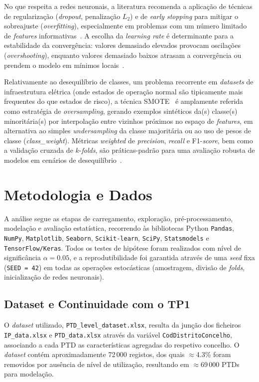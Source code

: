 \documentclass[conference]{IEEEtran}
\begin{document}
No que respeita a redes neuronais, a literatura recomenda a aplicação de técnicas de regularização (\textit{dropout}, penalização $L_2$) e de \textit{early stopping} para mitigar o sobreajuste (\textit{overfitting}), especialmente em problemas com um número limitado de \textit{features} informativas~\cite{b1}. A escolha da \textit{learning rate} é determinante para a estabilidade da convergência: valores demasiado elevados provocam oscilações (\textit{overshooting}), enquanto valores demasiado baixos atrasam a convergência ou prendem o modelo em mínimos locais~\cite{b1}.

Relativamente ao desequilíbrio de classes, um problema recorrente em \textit{datasets} de infraestrutura elétrica (onde estados de operação normal são tipicamente mais frequentes do que estados de risco), a técnica SMOTE~\cite{b1,b3} é amplamente referida como estratégia de \textit{oversampling}, gerando exemplos sintéticos da(s) classe(s) minoritária(s) por interpolação entre vizinhos próximos no espaço de \textit{features}, em alternativa ao simples \textit{undersampling} da classe majoritária ou ao uso de pesos de classe (\textit{class\_weight}). Métricas \textit{weighted} de \textit{precision}, \textit{recall} e F1-\textit{score}, bem como a validação cruzada de $k$-\textit{folds}, são práticas-padrão para uma avaliação robusta de modelos em cenários de desequilíbrio~\cite{b1,b2,b3}.

\section{Metodologia e Dados}

A análise segue as etapas de carregamento, exploração, pré-processamento, modelação e avaliação estatística, recorrendo às bibliotecas Python \texttt{Pandas}, \texttt{NumPy}, \texttt{Matplotlib}, \texttt{Seaborn}, \texttt{Scikit-learn}, \texttt{SciPy}, \texttt{Statsmodels} e \texttt{TensorFlow/Keras}. Todos os testes de hipótese foram realizados com nível de significância $\alpha = 0.05$, e a reprodutibilidade foi garantida através de uma \textit{seed} fixa (\texttt{SEED = 42}) em todas as operações estocásticas (amostragem, divisão de \textit{folds}, inicialização de redes neuronais).

\subsection{Dataset e Continuidade com o TP1}

O \textit{dataset} utilizado, \texttt{PTD\_level\_dataset.xlsx}, resulta da junção dos ficheiros \texttt{IP\_data.xlsx} e \texttt{PTD\_data.xlsx} através da variável \texttt{CodDistritoConcelho}, associando a cada PTD as características agregadas do respetivo concelho. O \textit{dataset} contém aproximadamente 72\,000 registos, dos quais $\approx$4.3\% foram removidos por ausência de nível de utilização, resultando em $\approx$69\,000 PTDs para modelação.
\end{document}

